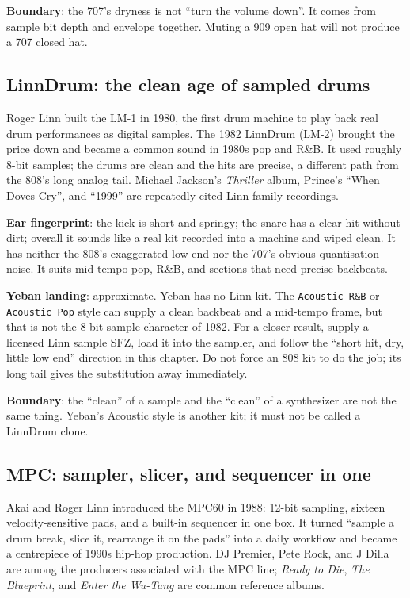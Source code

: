 \textbf{Boundary}: the 707's dryness is not ``turn the volume down''. It
comes from sample bit depth and envelope together. Muting a 909 open hat will
not produce a 707 closed hat.

\subsection{LinnDrum: the clean age of sampled drums}
\label{sec:iconic-linn}

Roger Linn built the LM-1 in 1980, the first drum machine to play back real
drum performances as digital samples. The 1982 LinnDrum (LM-2) brought the
price down and became a common sound in 1980s pop and R\&B. It used roughly
8-bit samples; the drums are clean and the hits are precise, a different path
from the 808's long analog tail. Michael Jackson's \emph{Thriller} album,
Prince's ``When Doves Cry'', and ``1999'' are repeatedly cited Linn-family
recordings.

\textbf{Ear fingerprint}: the kick is short and springy; the snare has a
clear hit without dirt; overall it sounds like a real kit recorded into a
machine and wiped clean. It has neither the 808's exaggerated low end nor the
707's obvious quantisation noise. It suits mid-tempo pop, R\&B, and sections
that need precise backbeats.

\textbf{Yeban landing}: approximate. Yeban has no Linn kit. The
\texttt{Acoustic R\&B} or \texttt{Acoustic Pop} style can supply a clean
backbeat and a mid-tempo frame, but that is not the 8-bit sample character of
1982. For a closer result, supply a licensed Linn sample SFZ, load it into the
sampler, and follow the ``short hit, dry, little low end'' direction in this
chapter. Do not force an 808 kit to do the job; its long tail gives the
substitution away immediately.

\textbf{Boundary}: the ``clean'' of a sample and the ``clean'' of a
synthesizer are not the same thing. Yeban's Acoustic style is another kit; it
must not be called a LinnDrum clone.

\subsection{MPC: sampler, slicer, and sequencer in one}
\label{sec:iconic-mpc}

Akai and Roger Linn introduced the MPC60 in 1988: 12-bit sampling, sixteen
velocity-sensitive pads, and a built-in sequencer in one box. It turned
``sample a drum break, slice it, rearrange it on the pads'' into a daily
workflow and became a centrepiece of 1990s hip-hop production. DJ Premier,
Pete Rock, and J Dilla are among the producers associated with the MPC line;
\emph{Ready to Die}, \emph{The Blueprint}, and \emph{Enter the Wu-Tang} are
common reference albums.

